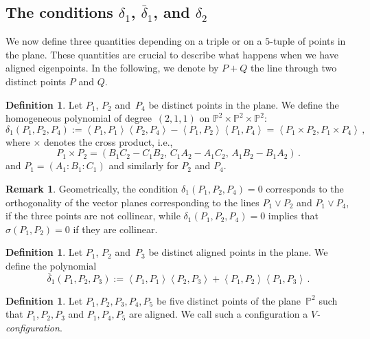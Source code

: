 \documentclass{amsart}
\theoremstyle{plain}
\theoremstyle{definition}
\newtheorem{definition}[lemma]{Definition}
\newtheorem{rmk}[lemma]{Remark}
\newcommand{\p}{\mathbb{P}}
\newcommand{\scl}[2]{\left\langle {#1}, {#2} \right\rangle}
\begin{document}
\subsection{The conditions \texorpdfstring{$\delta_1$}{delta1}, \texorpdfstring{$\bar{\delta}_1$}{deltabar1}, and \texorpdfstring{$\delta_2$}{delta2}}

We now define three quantities depending on a triple or on a $5$-tuple of points in the plane.
These quantities are crucial to describe what happens when we have aligned eigenpoints.
In the following, we denote by $P + Q$ the line through two distinct points $P$ and $Q$.

\begin{definition}
\label{definition:delta1}
 Let $P_1$, $P_2$ and~$P_4$ be distinct points in the plane.
 We define the homogeneous polynomial of degree~$(2,1,1)$ on $\p^2 \times \p^2 \times \p^2$:
 \[
  \delta_1(P_1, P_2, P_4) :=
  \scl{P_1}{P_1} \scl{P_2}{P_4} - \scl{P_1}{P_2}\scl{P_1}{P_4}
  =
  \scl{P_1\times P_2}{P_1 \times P_4} \,,
 \]
 where $\times$ denotes the cross product, i.e.,
 \[
  P_1 \times P_2 = (B_1 C_2 - C_1 B_2, \, C_1 A_2 - A_1 C_2, \, A_1 B_2 - B_1 A_2) \,.
 \]
 and $P_1 = (A_1: B_1: C_1)$ and similarly for $P_2$ and $P_4$.
\end{definition}

\begin{rmk}\label{rmk: significato di delta1}
 Geometrically, the condition $\delta_1(P_1, P_2, P_4) = 0$ corresponds to the orthogonality of the vector planes corresponding to the lines $P_1 \vee P_2$ and $P_1 \vee P_4$, if the three points are not collinear, while
 $\delta_1(P_1, P_2, P_4) = 0$ implies that $\sigma (P_1,P_2)=0$ if they are collinear.
\end{rmk}


\begin{definition}
\label{definition:delta1b}
 Let $P_1$, $P_2$ and~$P_3$ be distinct aligned points in the plane.
 We define the polynomial
 \[
  \overline{\delta}_1(P_1, P_2, P_3) :=
  \scl{P_1}{P_1} \scl{P_2}{P_3} + \scl{P_1}{P_2}\scl{P_1}{P_3} \,.
  \]
\end{definition}

\begin{definition}
\label{Vconf}
Let $P_1, P_2, P_3, P_4, P_5$ be five distinct points of the plane~$\p^2$
such that $P_1, P_2, P_3$ and $P_1, P_4, P_5$ are aligned.
We call such a configuration a \emph{$V$-configuration}.
\end{definition}
\end{document}
